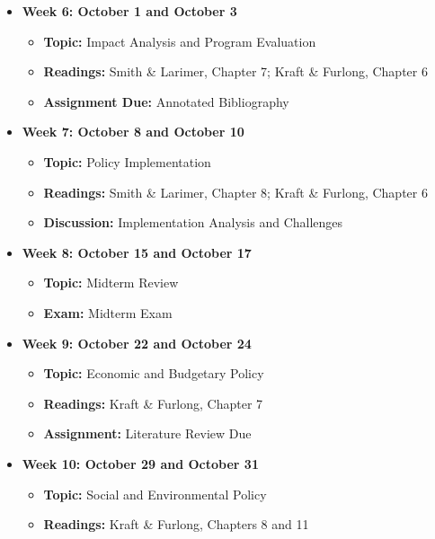 \documentclass[12pt, letterpaper]{article}
\begin{document}
\begin{itemize}
    \item \textbf{Week 6: October 1 and October 3}
    \begin{itemize}
        \item \textbf{Topic:} Impact Analysis and Program Evaluation
        \item \textbf{Readings:} Smith \& Larimer, Chapter 7; Kraft \& Furlong, Chapter 6
        \item \textbf{Assignment Due:} Annotated Bibliography 
    \end{itemize}

    \item \textbf{Week 7: October 8 and October 10}
    \begin{itemize}
        \item \textbf{Topic:} Policy Implementation
        \item \textbf{Readings:} Smith \& Larimer, Chapter 8; Kraft \& Furlong, Chapter 6
        \item \textbf{Discussion:} Implementation Analysis and Challenges
    \end{itemize}

    \item \textbf{Week 8: October 15 and October 17}
    \begin{itemize}
        \item \textbf{Topic:} Midterm Review
        \item \textbf{Exam:} Midterm Exam
    \end{itemize}

    \item \textbf{Week 9: October 22 and October 24}
    \begin{itemize}
        \item \textbf{Topic:} Economic and Budgetary Policy
        \item \textbf{Readings:} Kraft \& Furlong, Chapter 7
        \item \textbf{Assignment:} Literature Review Due
    \end{itemize}

    \item \textbf{Week 10: October 29 and October 31}
    \begin{itemize}
        \item \textbf{Topic:} Social and Environmental Policy
        \item \textbf{Readings:} Kraft \& Furlong, Chapters 8 and 11
    \end{itemize}


\end{itemize}
\end{document}
